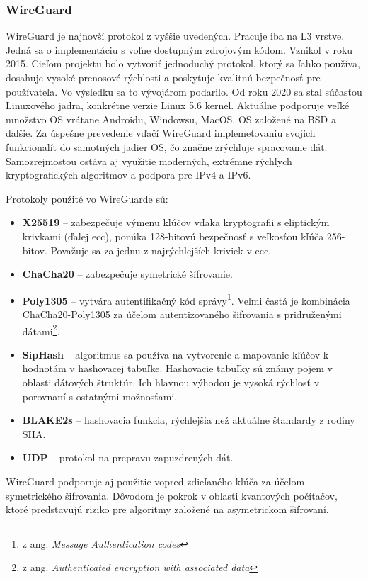 \subsubsection{WireGuard}
WireGuard je najnovší protokol z vyššie uvedených. Pracuje iba na L3 vrstve. Jedná sa o implementáciu s voľne dostupným zdrojovým kódom. Vznikol v roku 2015. Cieľom projektu bolo vytvoriť jednoduchý protokol, ktorý sa ľahko používa, dosahuje vysoké prenosové rýchlosti a poskytuje kvalitnú bezpečnosť pre používateľa. Vo výsledku sa to vývojárom podarilo. Od roku 2020 sa stal súčasťou Linuxového jadra, konkrétne verzie Linux 5.6 kernel. Aktuálne podporuje veľké množstvo OS vrátane Androidu, Windowsu, MacOS, OS založené na BSD \cite{bsd} a ďalšie. Za úspešne prevedenie vďačí WireGuard implemetovaniu svojich funkcionalít do samotných jadier OS, čo značne zrýchľuje spracovanie dát. Samozrejmostou ostáva aj využitie moderných, extrémne rýchlych kryptografických algoritmov a podpora pre IPv4 a IPv6. 

Protokoly použité vo WireGuarde sú:
\begin{itemize}
	\item{\textbf{X25519}} \cite{x25519} -- zabezpečuje výmenu kľúčov vďaka kryptografii s eliptickým krivkami \cite{ecc} (ďalej \acrshort{ecc}), ponúka 128-bitovú bezpečnosť s veľkosťou kľúča 256-bitov. Považuje sa za jednu z najrýchlejších kriviek v \acrshort{ecc}.
	\item{\textbf{ChaCha20}} \cite{chacha} -- zabezpečuje symetrické šífrovanie.
	\item{\textbf{Poly1305}} \cite{poly} -- vytvára autentifikačný kód správy\footnote{z ang. \textit{Message Authentication codes}}. Veľmi častá je kombinácia ChaCha20-Poly1305 za účelom autentizovaného šifrovania s pridruženými dátami\footnote{z ang. \textit{Authenticated encryption with associated data}}.
	\item{\textbf{SipHash}} \cite{siphash} -- algoritmus sa používa na vytvorenie a mapovanie kľúčov k hodnotám v hashovacej tabuľke. Hashovacie tabuľky sú známy pojem v oblasti dátových štruktúr. Ich hlavnou výhodou je vysoká rýchlosť v porovnaní s ostatnými možnosťami.  
	\item{\textbf{BLAKE2s}} \cite{blake} -- hashovacia funkcia, rýchlejšia než aktuálne štandardy z rodiny SHA. 
	\item{\textbf{UDP}} --  protokol na prepravu zapuzdrených dát.
\end{itemize} 
WireGuard podporuje aj použitie vopred zdieľaného kľúča za účelom symetrického šifrovania. Dôvodom je pokrok v oblasti kvantových počítačov, ktoré predstavujú riziko pre algoritmy založené na asymetrickom šifrovaní.

